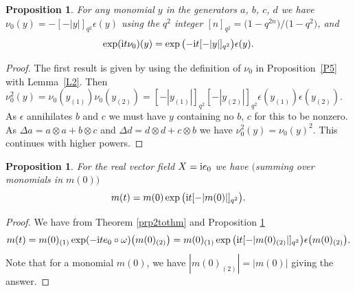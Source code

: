 \documentclass[pdftex]{sigma}
\numberwithin{equation}{section}
\newtheorem{Proposition}[Theorem]{Proposition}
 { \theoremstyle{definition}
\newtheorem{Definition}[Theorem]{Definition}
\newtheorem{Note}[Theorem]{Note}
\newtheorem{Example}[Theorem]{Example}
\newtheorem{Remark}[Theorem]{Remark} }
\newcommand{\tens}{\mathop{\otimes}}
\newcommand{\<}{\langle}
\renewcommand{\>}{\rangle}
\begin{document}
\begin{Proposition}\label{P4}
For any monomial $ y $ in the generators $ a$, $b$, $c$, $d $ we have $ \nu_{0}(y)=-[-|y|]_{q^{2}} \epsilon (y) $ using the $ q^{2} $ integer $ [n]_{q^{2}}= \big(1-q^{2n}\big)/\big(1-q^{2}\big) $, and
	\[\exp ({\rm i} t \nu_{0})(y)=\exp\big({-}{\rm i} t[-|y|]_{q^{2}}\big) \epsilon(y).\]
\end{Proposition}
\begin{proof}
	The first result is given by using the definition of $ \nu_{0} $ in Proposition~\ref{P5} with Lemma~\ref{L2}. Then $ \nu_{0}^{2}(y)=\nu_{0}(y_{(1)}) \nu_{0} (y_{(2)})= [-|y_{(1)}|]_{q^{2}} [-|y_{(2)}|]_{q^{2}} \epsilon(y_{(1)}) \epsilon(y_{(2)})$. As $ \epsilon $ annihilates $ b $ and $ c $ we must have $ y $ containing no $ b$, $c $ for this to be nonzero. As $ \Delta a= a \tens a +b \tens c$ and $ \Delta d= d\tens d+c \tens b$ we have $ \nu_{0}^{2}(y)=\nu_{0}(y)^{2} $. This continues with higher powers.
\end{proof}
\begin{Proposition}
	For the real vector field $ X={\rm i}e_{0} $ we have $($summing over monomials in $ m(0))$
	\[m(t)=m(0)\exp \big({\rm i}t [-|m(0)|]_{q^{2}}\big).\]
\end{Proposition}
\begin{proof}
	We have from Theorem \ref{prp2tothm} and Proposition \ref{P4}
\[
		m(t)=m(0)_{(1)} \exp (-{\rm i}t e_{0} \circ \omega)\big(m(0)_{(2)}\big)=m(0)_{(1)} \exp \big({\rm i}t [-|m(0)_{(2)}|]_{q^{2}}\big) \epsilon \big(m(0)_{(2)}\big).
\]
	Note that for a monomial $ m(0) $, we have $ |m(0)_{(2)}|=|m(0)| $ giving the answer.
\end{proof}
\end{document}
